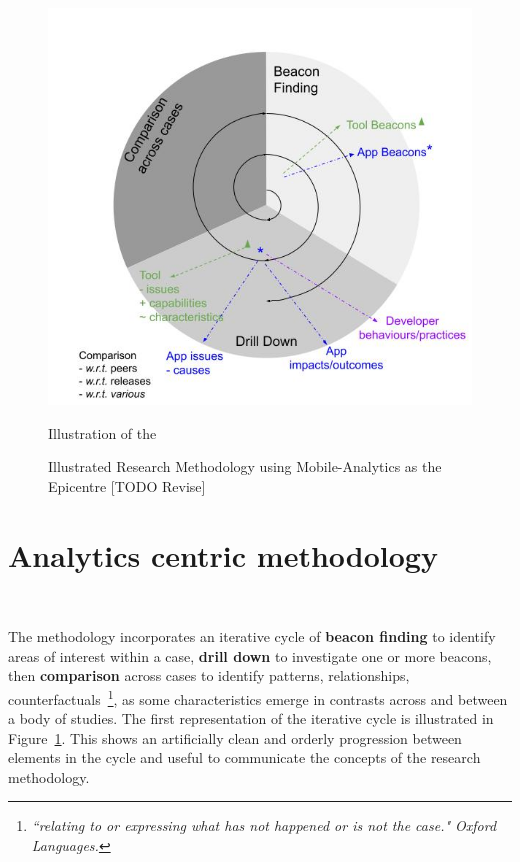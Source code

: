 \begin{figure}
    \centering
    \includegraphics[width=14cm]{images/my/Illustrated-Research-Methodology-using-Mobile-Analytics-as-the-Epicentre-v0-2.jpeg}
    \caption{Illustrated Research Methodology using Mobile-Analytics as the Epicentre [TODO Revise]}
    Illustration of the 
    \label{fig:Illustrated-Research-Methodology-using-Mobile-Analytics-as-the-Epicentre}
\end{figure}

\dotfill 

\section{Analytics centric methodology}~\label{analytics-centric-methodology-section}

The methodology incorporates an iterative cycle of \textbf{beacon finding} to identify areas of interest within a case, \textbf{drill down} to investigate one or more beacons, then \textbf{comparison} across cases to identify patterns, relationships, counterfactuals~\footnote{\emph{``relating to or expressing what has not happened or is not the case." Oxford Languages.}}, as some characteristics emerge in contrasts across and between a body of studies. The first representation of the iterative cycle is illustrated in Figure~\ref{fig:Illustrated-Research-Methodology-using-Mobile-Analytics-as-the-Epicentre}. This shows an artificially clean and orderly progression between elements in the cycle and useful to communicate the concepts of the research methodology. 

